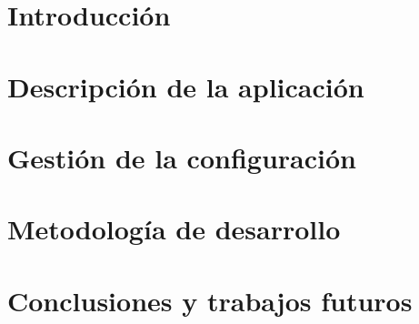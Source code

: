 \documentclass[spanish,a4paper,twoside]{report}
\begin{document}

\chapter{Introducción}
\label{chapter:intro}



\newpage{\pagestyle{empty}\cleardoublepage}
\thispagestyle{empty}

\chapter{Descripción de la aplicaci\'on}
\label{chapter:dos}



\newpage{\pagestyle{empty}\cleardoublepage}
\thispagestyle{empty}

\chapter{Gestión de la configuración}
\label{chapter:tres}



\newpage{\pagestyle{empty}\cleardoublepage}
\thispagestyle{empty}

\chapter{Metodología de desarrollo}
\label{chapter:cuatro}



\newpage{\pagestyle{empty}\cleardoublepage}
\thispagestyle{empty}

\chapter{Conclusiones y trabajos futuros}
\label{chapter:conclusiones}



\newpage{\pagestyle{empty}\cleardoublepage}
\thispagestyle{empty}
 
\end{document}
